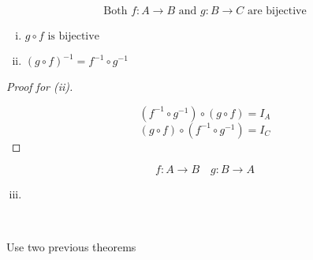 \begin{frame}{}
  \begin{theorem}
    \[
      \text{Both } f: A \to B \text{ and } g: B \to C \text{ are bijective}
    \]

    \begin{enumerate}[(i)]
      \item $g \circ f \text{ is bijective}$
      \item $(g \circ f)^{-1} = f^{-1} \circ g^{-1}$
    \end{enumerate}
  \end{theorem}

  \pause
  \begin{proof}[Proof for (ii)]
    \pause
    \begin{center}
    \end{center}

    \[
      (f^{-1} \circ g^{-1}) \circ (g \circ f) = I_A
    \]
    \[
      (g \circ f) \circ (f^{-1} \circ g^{-1}) = I_C
    \]
  \end{proof}
\end{frame}

\begin{frame}{}
  \begin{theorem}[]
    \[
      f: A \to B \quad g: B \to A
    \]

    \begin{enumerate}[(i)]
      \setcounter{enumi}{2}
      \item {}
    \end{enumerate}
  \end{theorem}

  \pause
  \begin{center}
     \\[5pt]
  \end{center}

  \pause
  \vspace{0.20cm}
  \begin{center}
    Use two previous theorems
  \end{center}
\end{frame}
